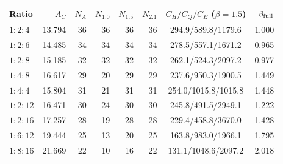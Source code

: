 \begin{tabular*}{\textwidth}{@{\extracolsep{\fill}}lrrrrrcr@{}}\toprule
Ratio & $A_C$ & $N_A$ & $N_{1.0}$ & $N_{1.5}$ & $N_{2.1}$ & $C_H/C_Q/C_E$ ($\beta=1.5$) & $\beta_{\rm full}$ \\\midrule
$1:2:4$ & 13.794 & 36 & 36 & 36 & 36 & 294.9/589.8/1179.6 & 1.000 \\
$1:2:6$ & 14.485 & 34 & 34 & 34 & 34 & 278.5/557.1/1671.2 & 0.965 \\
$1:2:8$ & 15.185 & 32 & 32 & 32 & 32 & 262.1/524.3/2097.2 & 0.977 \\
$1:4:8$ & 16.617 & 29 & 20 & 29 & 29 & 237.6/950.3/1900.5 & 1.449 \\
$1:4:4$ & 15.804 & 31 & 21 & 31 & 31 & 254.0/1015.8/1015.8 & 1.448 \\
$1:2:12$ & 16.471 & 30 & 24 & 30 & 30 & 245.8/491.5/2949.1 & 1.222 \\
$1:2:16$ & 17.257 & 28 & 19 & 28 & 28 & 229.4/458.8/3670.0 & 1.428 \\
$1:6:12$ & 19.444 & 25 & 13 & 20 & 25 & 163.8/983.0/1966.1 & 1.795 \\
$1:8:16$ & 21.669 & 22 & 10 & 16 & 22 & 131.1/1048.6/2097.2 & 2.018 \\
\bottomrule\end{tabular*}
